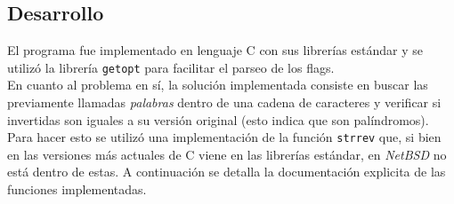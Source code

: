 \documentclass[a4paper, 10pt]{article}
\def\code#1{\texttt{#1}}
\newcommand\tab[1][0.5cm]{\hspace*{#1}}
\begin{document}
		\subsection{Desarrollo}
			El programa fue implementado en lenguaje C con sus librerías estándar y se utilizó la librería
			\code{getopt} para facilitar el parseo de los flags. \\
			\tab En cuanto al problema en sí, la solución implementada consiste en buscar las previamente
			llamadas \emph{palabras} dentro de una cadena de caracteres y verificar si invertidas son iguales
			a su versión original (esto indica que son palíndromos). Para hacer esto se utilizó una implementación
			de la función \code{strrev} que, si bien en las versiones más actuales de C viene en las librerías
			estándar, en \emph{NetBSD} no está dentro de estas.
			A continuación se detalla la documentación explicita de las funciones implementadas.
\end{document}
